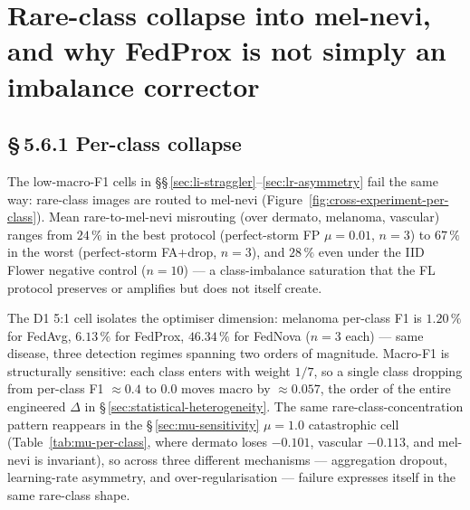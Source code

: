 \documentclass[11pt,a4paper]{report}
\begin{document}

\section{Rare-class collapse into mel-nevi, and why FedProx is not simply
an imbalance corrector}
\label{sec:rare-class-collapse}


\subsection*{\S\,5.6.1 Per-class collapse}

The low-macro-F1 cells in \S\S\,\ref{sec:li-straggler}--\ref{sec:lr-asymmetry}
fail the same way: rare-class images are routed to mel-nevi
(Figure~\ref{fig:cross-experiment-per-class}). Mean rare-to-mel-nevi
misrouting (over dermato, melanoma, vascular) ranges from $24\,\%$ in the
best protocol (perfect-storm FP $\mu = 0.01$, $n=3$) to $67\,\%$ in the
worst (perfect-storm FA+drop, $n=3$), and $28\,\%$ even under the IID
Flower negative control ($n=10$) --- a class-imbalance saturation that the
FL protocol preserves or amplifies but does not itself create.

The D1 5:1 cell isolates the optimiser dimension: melanoma per-class F1 is
$1.20\,\%$ for FedAvg, $6.13\,\%$ for FedProx, $46.34\,\%$ for FedNova
($n=3$ each) --- same disease, three detection regimes spanning two orders
of magnitude. Macro-F1 is structurally sensitive: each class enters with
weight $1/7$, so a single class dropping from per-class F1 $\approx 0.4$ to
$0.0$ moves macro by $\approx 0.057$, the order of the entire engineered
$\Delta$ in \S\,\ref{sec:statistical-heterogeneity}. The same
rare-class-concentration pattern reappears in the
\S\,\ref{sec:mu-sensitivity} $\mu = 1.0$ catastrophic cell
(Table~\ref{tab:mu-per-class}, where dermato loses $-0.101$, vascular
$-0.113$, and mel-nevi is invariant), so across three different mechanisms
--- aggregation dropout, learning-rate asymmetry, and over-regularisation
--- failure expresses itself in the same rare-class shape.
\end{document}
